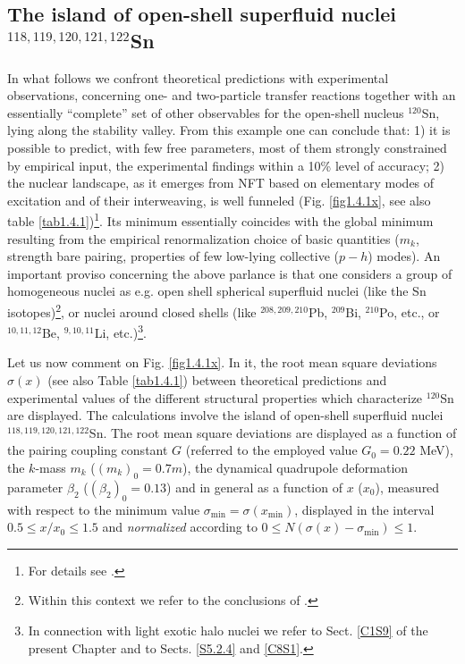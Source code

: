 \subsection{The island of open-shell superfluid nuclei $^{118,119,120,121,122}$Sn}\label{S2.4.1}
In what follows we confront theoretical predictions with experimental observations, concerning one- and two-particle transfer reactions together with an essentially ``complete'' set of other  observables  for the open-shell nucleus $^{120}$Sn, lying  along the stability valley. From this example one can conclude that: 1) it is possible to predict, with few free parameters, most of them strongly constrained by empirical input, the experimental findings within a 10\% level of accuracy; 2) the nuclear landscape, as it emerges from NFT based on elementary modes of excitation and of their interweaving, is well funneled (Fig. \ref{fig1.4.1x}, see also table \ref{tab1.4.1})\footnote{For details see \cite{Idini:15}.}. Its minimum essentially coincides with the global minimum resulting from the empirical renormalization choice of basic quantities ($m_k$, strength bare pairing, properties of few low-lying collective ($p-h$) modes). An important proviso concerning the above parlance is that one considers a group of homogeneous nuclei as e.g. open shell spherical superfluid nuclei (like the Sn isotopes)\footnote{Within this context we refer to the conclusions of \cite{Idini:15}.}, or nuclei around closed shells (like $^{208,209,210}$Pb, $^{209}$Bi, $^{210}$Po, etc., or $^{10,11,12}$Be, $^{9,10,11}$Li, etc.)\footnote{In connection with light exotic halo nuclei we refer to Sect. \ref{C1S9} of the present Chapter and to Sects. \ref{S5.2.4} and \ref{C8S1}.}. 



 Let us now  comment on Fig. \ref{fig1.4.1x}. In it, the root mean square deviations $\sigma(x)$ (see also Table \ref{tab1.4.1}) between theoretical predictions  and experimental values of the different structural properties which  characterize  $^{120}$Sn are displayed. The calculations involve the island of open-shell superfluid nuclei $^{118,119,120,121,122}$Sn. The root mean square deviations are displayed  as a function of the pairing coupling constant $G$ (referred to the employed value $G_0 = 0.22$ MeV), the $k$-mass $m_k$ ($(m_k)_0 = 0.7 m$),  the dynamical quadrupole  deformation parameter $\beta_2$ ($(\beta_{2})_0 = 0.13$)  and in general as a function of $x$ ($x_0$), measured with respect to the minimum value $\sigma_{\textrm{min}} = \sigma (x_{\textrm{min}})$, displayed in the interval $0.5 \leq x/x_0 \leq 1.5$ and \textit{normalized} according to $0 \leq N(\sigma(x) - \sigma_{\textrm{min}}) \leq 1$.
 
